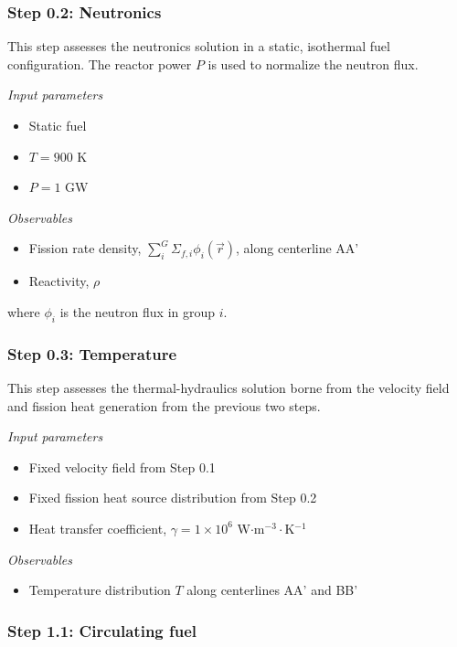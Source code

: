 \subsubsection{Step 0.2: Neutronics}

This step assesses the neutronics solution in a static, isothermal fuel
configuration. The reactor power $P$ is used to normalize the neutron flux.

\textit{Input parameters}
%
\begin{itemize}
    \itemsep0em
    \item Static fuel
    \item $T = 900$ K
    \item $P = 1$ GW
\end{itemize}

\textit{Observables}
\begin{itemize}
    \itemsep0em
    \item Fission rate density, $\sum^G_i \Sigma_{f,i} \phi_i(\vec{r})$, along
    centerline AA'
    \item Reactivity, $\rho$
\end{itemize}
where $\phi_i$ is the neutron flux in group $i$.

\subsubsection{Step 0.3: Temperature}

This step assesses the thermal-hydraulics solution borne from the velocity
field and fission heat generation from the previous two steps.

\textit{Input parameters}
%
\begin{itemize}
    \itemsep0em
    \item Fixed velocity field from Step 0.1
    \item Fixed fission heat source distribution from Step 0.2
    \item Heat transfer coefficient, $\gamma = 1 \times 10^6$ W$\cdot$m$^{-3}
    \cdot$K$^{-1}$
\end{itemize}

\textit{Observables}
\begin{itemize}
    \itemsep0em
    \item Temperature distribution $T$ along centerlines AA' and BB'
\end{itemize}

\subsubsection{Step 1.1: Circulating fuel}


